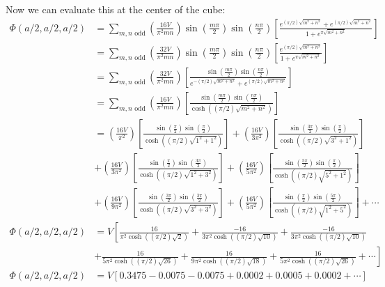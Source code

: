\documentclass{article}
\begin{document}
Now we can evaluate this at the center of the cube:
\begin{align*}
\Phi(a/2,a/2,a/2) &= \sum_{m,n \text{ odd}} \left(\frac{16V}{\pi^{2}mn}\right) \sin\left(\frac{ m\pi }{ 2 }\right) \sin\left(\frac{ n\pi }{ 2 }\right) \left[ \frac{ e^{(\pi/2)\sqrt{m^{2} + n^{2}}} + e^{(\pi/2)\sqrt{m^{2} + n^{2}}}}{ 1 + e^{\pi\sqrt{m^{2} + n^{2}}} } \right]\\
&= \sum_{m,n \text{ odd}} \left(\frac{32V}{\pi^{2}mn}\right) \sin\left(\frac{ m\pi }{ 2 }\right) \sin\left(\frac{ n\pi }{ 2 }\right) \left[ \frac{ e^{(\pi/2)\sqrt{m^{2} + n^{2}}}}{ 1 + e^{\pi\sqrt{m^{2} + n^{2}}} } \right]\\
&= \sum_{m,n \text{ odd}} \left(\frac{32V}{\pi^{2}mn}\right) \left[ \frac{ \sin\left(\frac{ m\pi }{ 2 }\right) \sin\left(\frac{ n\pi }{ 2 }\right) }{ e^{-(\pi/2)\sqrt{m^{2} + n^{2}}} + e^{(\pi/2)\sqrt{m^{2} + n^{2}}} } \right]\\
&= \sum_{m,n \text{ odd}} \left(\frac{16V}{\pi^{2}mn}\right) \left[ \frac{ \sin\left(\frac{ m\pi }{ 2 }\right) \sin\left(\frac{ n\pi }{ 2 }\right) }{ \cosh\left((\pi/2)\sqrt{m^{2} + n^{2}}\right) } \right]\\
&= \left(\frac{16V}{\pi^{2}}\right) \left[ \frac{ \sin\left(\frac{ \pi }{ 2 }\right) \sin\left(\frac{ \pi }{ 2 }\right) }{ \cosh\left((\pi/2)\sqrt{1^{2} + 1^{2}}\right) } \right] + \left(\frac{16V}{3\pi^{2}}\right) \left[ \frac{ \sin\left(\frac{ 3\pi }{ 2 }\right) \sin\left(\frac{ \pi }{ 2 }\right) }{ \cosh\left((\pi/2)\sqrt{3^{2} + 1^{2}}\right) } \right]\\
&+ \left(\frac{16V}{3\pi^{2}}\right) \left[ \frac{ \sin\left(\frac{ \pi }{ 2 }\right) \sin\left(\frac{ 3\pi }{ 2 }\right) }{ \cosh\left((\pi/2)\sqrt{1^{2} + 3^{2}}\right) } \right] + \left(\frac{16V}{5\pi^{2}}\right) \left[ \frac{ \sin\left(\frac{ 5\pi }{ 2 }\right) \sin\left(\frac{ \pi }{ 2 }\right) }{ \cosh\left((\pi/2)\sqrt{5^{2} + 1^{2}}\right) } \right]\\
&+ \left(\frac{16V}{9\pi^{2}}\right) \left[ \frac{ \sin\left(\frac{ 3\pi }{ 2 }\right) \sin\left(\frac{ 3\pi }{ 2 }\right) }{ \cosh\left((\pi/2)\sqrt{3^{2} + 3^{2}}\right) } \right] + \left(\frac{16V}{5\pi^{2}}\right) \left[ \frac{ \sin\left(\frac{ \pi }{ 2 }\right) \sin\left(\frac{ 5\pi }{ 2 }\right) }{ \cosh\left((\pi/2)\sqrt{1^{2} + 5^{2}}\right) } \right] + \cdots\\
\Phi(a/2,a/2,a/2) &= V\left[ \frac{ 16 }{ \pi^{2}\cosh\left((\pi/2)\sqrt{2}\right) } + \frac{ -16 }{ 3\pi^{2}\cosh\left((\pi/2)\sqrt{10}\right) } + \frac{ -16 }{ 3\pi^{2}\cosh\left((\pi/2)\sqrt{10}\right) } \right.\\
&+ \left. \frac{ 16 }{ 5\pi^{2}\cosh\left((\pi/2)\sqrt{26}\right) } + \frac{ 16 }{ 9\pi^{2}\cosh\left((\pi/2)\sqrt{18}\right) } + \frac{ 16 }{ 5\pi^{2}\cosh\left((\pi/2)\sqrt{26}\right) } + \cdots \right]\\
\Phi(a/2,a/2,a/2) &= V\left[ 0.3475 - 0.0075 - 0.0075 + 0.0002 + 0.0005 + 0.0002 + \cdots \right]\\
\end{align*}
\end{document}
